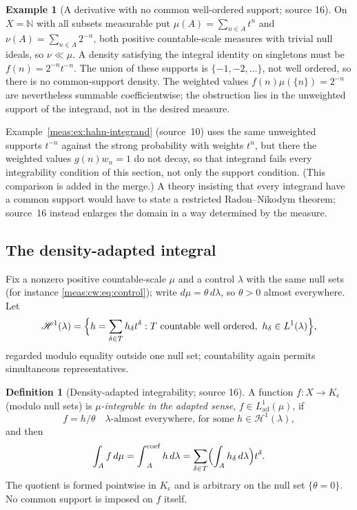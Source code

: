 \documentclass[11pt]{article}
\numberwithin{equation}{section}
\theoremstyle{definition}
\newtheorem{definition}[theorem]{Definition}
\newtheorem{example}[theorem]{Example}
\theoremstyle{remark}
\newcommand{\N}{\mathbb N}
\newcommand{\Kc}{K_{\mathrm c}}
\newcommand{\intc}{\mathop{\int}\nolimits^{\mathrm{coef}}}
\newcommand{\Lad}{L^1_{\mathrm{ad}}}
\newcommand{\Hone}[1]{\mathscr H^1(#1)}
\begin{document}
\begin{example}[A derivative with no common well-ordered support; source 16]
\label{meas:cw:ex:rn-support}
On $X=\N$ with all subsets measurable put $\mu(A)=\sum_{n\in A}t^n$ and
$\nu(A)=\sum_{n\in A}2^{-n}$, both positive countable-scale measures with trivial
null ideals, so $\nu\ll\mu$. A density satisfying the integral identity on
singletons must be $f(n)=2^{-n}t^{-n}$. The union of these supports is
$\{-1,-2,\ldots\}$, not well ordered, so there is no common-support density. The
weighted values $f(n)\mu(\{n\})=2^{-n}$ are nevertheless summable
coefficientwise; the obstruction lies in the unweighted support of the
integrand, not in the desired measure.
\end{example}

Example~\ref{meas:ex:hahn-integrand} (source~10) uses the same unweighted
supports $t^{-n}$ against the strong probability with weights $t^n$, but there
the weighted values $g(n)w_n=1$ do not decay, so that integrand fails every
integrability condition of this section, not only the support condition. (This
comparison is added in the merge.) A theory insisting that every integrand have
a common support would have to state a restricted Radon--Nikodym theorem;
source~16 instead enlarges the domain in a way determined by the measure.

\subsection{The density-adapted integral}

Fix a nonzero positive countable-scale $\mu$ and a control $\lambda$ with the same
null sets (for instance \eqref{meas:cw:eq:control}); write $d\mu=\theta\,d\lambda$,
so $\theta>0$ almost everywhere. Let
\[
 \Hone{\lambda}=\Bigl\{h=\sum_{\delta\in T}h_\delta t^\delta:
 T\text{ countable well ordered},\ h_\delta\in L^1(\lambda)\Bigr\},
\]
regarded modulo equality outside one null set; countability again permits
simultaneous representatives.

\begin{definition}[Density-adapted integrability; source 16]
\label{meas:cw:def:adapted}
A function $f:X\to\Kc$ (modulo null sets) is \emph{$\mu$-integrable in the adapted
sense}, $f\in\Lad(\mu)$, if
\begin{equation}\label{meas:cw:eq:adapted-domain}
 f=h/\theta\quad\lambda\text{-almost everywhere, for some }h\in\Hone{\lambda},
\end{equation}
and then
\begin{equation}\label{meas:cw:eq:adapted-integral}
 \int_Af\,d\mu=\intc_Ah\,d\lambda=\sum_{\delta\in T}\Bigl(\int_Ah_\delta\,d\lambda\Bigr)t^\delta .
\end{equation}
The quotient is formed pointwise in $\Kc$ and is arbitrary on the null set
$\{\theta=0\}$. No common support is imposed on $f$ itself.
\end{definition}
\end{document}
